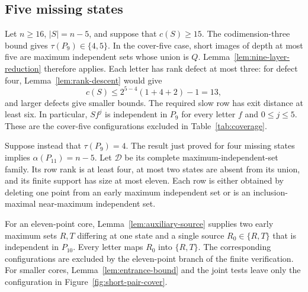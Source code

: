 \documentclass[11pt]{article}
\theoremstyle{definition}
\theoremstyle{plain}
\begin{document}
\subsection{Five missing states}\label{sec:m5}
Let $n\ge16$, $|S|=n-5$, and suppose that $c(S)\ge15$.
The codimension-three bound gives
$\tau(P_9)\in\{4,5\}$. In the cover-five case, short images of
depth at most five are maximum independent sets whose union is $Q$.
Lemma~\ref{lem:nine-layer-reduction} therefore applies. Each letter
has rank defect at most three: for defect four,
Lemma~\ref{lem:rank-descent} would give
\[
 c(S)\le 2^{5-4}(1+4+2)-1=13,
\]
and larger defects give smaller bounds. The required slow row has exit distance at least six. In particular,
$Sf^j$ is independent in $P_9$ for every letter $f$ and $0\le j\le5$.
These are the cover-five configurations excluded in
Table~\ref{tab:coverage}.

Suppose instead that $\tau(P_9)=4$. The result just proved for four
missing states implies $\alpha(P_{11})=n-5$. Let $\mathcal D$ be its
complete maximum-independent-set family. Its row rank is at least
four, at most two states are absent from its union, and its finite
support has size at most eleven. Each row is either obtained by
deleting one point from an early maximum independent set or is an
inclusion-maximal near-maximum independent set.

For an eleven-point core, Lemma~\ref{lem:auxiliary-source} supplies
two early maximum sets $R,T$ differing at one state and a single
source $R_0\in\{R,T\}$ that is independent in $P_{10}$.
Every letter maps $R_0$ into $\{R,T\}$. The corresponding
configurations are excluded by the eleven-point branch of the
finite verification. For smaller cores, Lemma~\ref{lem:entrance-bound}
and the joint tests leave only the configuration in
Figure~\ref{fig:short-pair-cover}.
\end{document}
